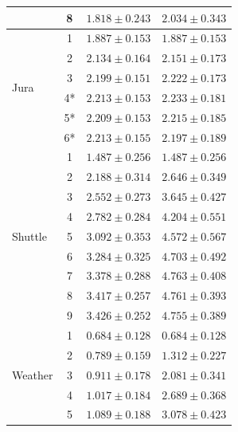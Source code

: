 \documentclass{article}
\newcommand{\f}[1]{\bm{#1}}
\begin{document}
\begin{table}
\begin{center}
{\begin{tabular}{lccc}
                             & 8  & $  {1.818 \pm 0.243}$ & $\f{ 2.034 \pm 0.343}$\\\hline
    \multirow{6}{*}{Jura}    & 1  & $\f{1.887 \pm 0.153}$ & $\f{ 1.887 \pm 0.153}$\\
                             & 2  & $  {2.134 \pm 0.164}$ & $\f{ 2.151 \pm 0.173}$\\
                             & 3  & $  {2.199 \pm 0.151}$ & $\f{ 2.222 \pm 0.173}$\\
                             & 4*  & $  {2.213 \pm 0.153}$ & $\f{ 2.233 \pm 0.181}$\\
                             & 5*  & $  {2.209 \pm 0.153}$ & $\f{ 2.215 \pm 0.185}$\\
                             & 6*  & $\f{2.213 \pm 0.155}$ & $  { 2.197 \pm 0.189}$\\\hline
    \multirow{9}{*}{Shuttle} & 1  & $\f{1.487 \pm 0.256}$ & $\f{ 1.487 \pm 0.256}$\\
                             & 2  & $  {2.188 \pm 0.314}$ & $\f{ 2.646 \pm 0.349}$\\
                             & 3  & $  {2.552 \pm 0.273}$ & $\f{ 3.645 \pm 0.427}$\\
                             & 4  & $  {2.782 \pm 0.284}$ & $\f{ 4.204 \pm 0.551}$\\
                             & 5  & $  {3.092 \pm 0.353}$ & $\f{ 4.572 \pm 0.567}$\\
                             & 6  & $  {3.284 \pm 0.325}$ & $\f{ 4.703 \pm 0.492}$\\
                             & 7  & $  {3.378 \pm 0.288}$ & $\f{ 4.763 \pm 0.408}$\\
                             & 8  & $  {3.417 \pm 0.257}$ & $\f{ 4.761 \pm 0.393}$\\
                             & 9  & $  {3.426 \pm 0.252}$ & $\f{ 4.755 \pm 0.389}$\\\hline
    \multirow{8}{*}{Weather} & 1  & $\f{0.684 \pm 0.128}$ & $\f{ 0.684 \pm 0.128}$\\
                             & 2  & $  {0.789 \pm 0.159}$ & $\f{ 1.312 \pm 0.227}$\\
                             & 3  & $  {0.911 \pm 0.178}$ & $\f{ 2.081 \pm 0.341}$\\
                             & 4  & $  {1.017 \pm 0.184}$ & $\f{ 2.689 \pm 0.368}$\\
                             & 5  & $  {1.089 \pm 0.188}$ & $\f{ 3.078 \pm 0.423}$\\

\end{tabular}}
\end{center}
\end{table}
\end{document}
